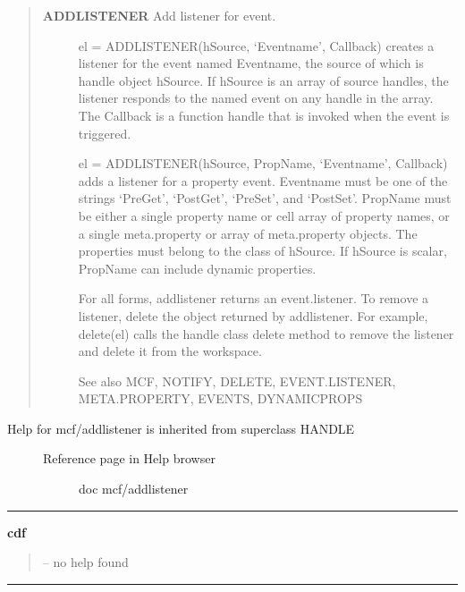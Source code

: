 \documentclass[letterpaper,10pt,english]{sphinxmanual}
\begin{document}
\label{classes/utils/@mcf/mcf:addlistener}\begin{quote}
\begin{description}
\item[{\textbf{ADDLISTENER}   Add listener for event.}] \leavevmode
el = ADDLISTENER(hSource, `Eventname', Callback) creates a listener
for the event named Eventname, the source of which is handle object
hSource.  If hSource is an array of source handles, the listener
responds to the named event on any handle in the array.  The Callback
is a function handle that is invoked when the event is triggered.

el = ADDLISTENER(hSource, PropName, `Eventname', Callback) adds a
listener for a property event.  Eventname must be one of the strings
`PreGet', `PostGet', `PreSet', and `PostSet'.  PropName must be either
a single property name or cell array of property names, or a single
meta.property or array of meta.property objects.  The properties must
belong to the class of hSource.  If hSource is scalar, PropName can
include dynamic properties.

For all forms, addlistener returns an event.listener.  To remove a
listener, delete the object returned by addlistener.  For example,
delete(el) calls the handle class delete method to remove the listener
and delete it from the workspace.

See also MCF, NOTIFY, DELETE, EVENT.LISTENER, META.PROPERTY, EVENTS,
DYNAMICPROPS

\end{description}
\end{quote}
\begin{description}
\item[{Help for mcf/addlistener is inherited from superclass HANDLE}] \leavevmode\begin{description}
\item[{Reference page in Help browser}] \leavevmode
doc mcf/addlistener

\end{description}

\end{description}


\bigskip\hrule{}\bigskip

\label{classes/utils/@mcf/mcf:cdf}
\textbf{cdf}
\begin{quote}

-- no help found
\end{quote}


\bigskip\hrule{}\bigskip
\end{document}
